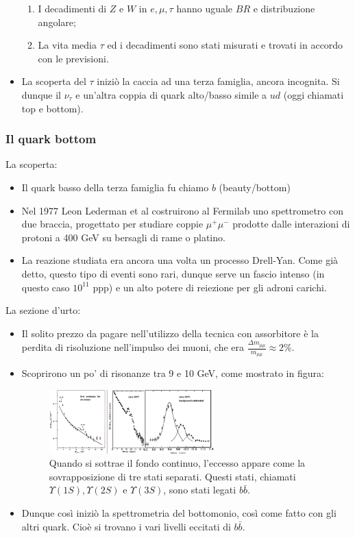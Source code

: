 \begin{itemize}
    \begin{enumerate}
        \item I decadimenti di $Z$ e $W$ in $e,\mu,\tau$ hanno uguale $BR$ e distribuzione angolare;
        \item La vita media $\tau$ ed i decadimenti sono stati misurati e trovati in accordo con le previsioni.
    \end{enumerate}
    \item La scoperta del $\tau$ iniziò la caccia ad una terza famiglia, ancora incognita. Si dunque il $\nu_\tau$ e un'altra coppia di quark alto/basso simile a $ud$ (oggi chiamati top e bottom).
\end{itemize}
\subsubsection{Il quark bottom}
La scoperta:
\begin{itemize}
    \item Il quark basso della terza famiglia fu chiamo $b$ (beauty/bottom)
    \item Nel 1977 Leon Lederman et al costruirono al Fermilab uno spettrometro con due braccia, progettato per studiare coppie $\mu^+\mu^-$ prodotte dalle interazioni di protoni a 400 GeV su bersagli di rame o platino.
    \item La reazione studiata era ancora una volta un processo Drell-Yan. Come già detto, questo tipo di eventi sono rari, dunque serve un fascio intenso (in questo caso $10^{11}$ ppp) e un alto potere di reiezione per gli adroni carichi.
\end{itemize}
La sezione d'urto:
\begin{itemize}
    \item Il solito prezzo da pagare nell'utilizzo della tecnica con assorbitore è la perdita di risoluzione nell'impulso dei muoni, che era $\frac{\Delta m_{\mu\mu}}{m_{\mu\mu}}\approx2\%$.
    \item Scoprirono un po' di risonanze tra 9 e 10 GeV, come mostrato in figura:
    \begin{figure}[H]
        \centering
        \includegraphics[width=0.6\textwidth]{immagini/fig_b_discovery.png}
        \caption{Quando si sottrae il fondo continuo, l'eccesso appare come la sovrapposizione di tre stati separati. Questi stati, chiamati $\Upsilon(1S),\Upsilon(2S)$ e $\Upsilon(3S)$, sono stati legati $b\bar b$.}
    \end{figure}
    \item Dunque così iniziò la spettrometria del bottomonio, così come fatto con gli altri quark. Cioè si trovano i vari livelli eccitati di $b\bar b$. 
\end{itemize}
